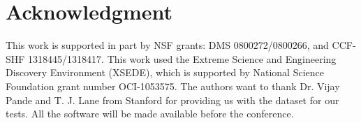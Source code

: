 \documentclass[10pt,conference,compsocconf]{IEEEtran}
\begin{document}
\section*{Acknowledgment}
This work is supported in part by NSF grants: DMS 0800272/0800266, and CCF-SHF 1318445/1318417. This work used the Extreme Science and Engineering Discovery Environment (XSEDE), which is supported by National Science Foundation grant number OCI-1053575. The authors want to thank Dr. Vijay Pande and T. J. Lane from Stanford  for providing us with the dataset for our tests. All the software will be made available before the conference. 



%
%
%
%
%
\end{document}
